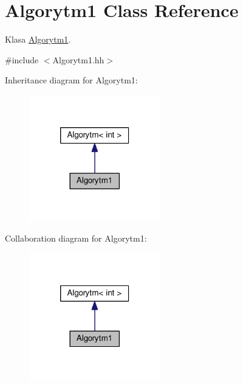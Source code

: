 \hypertarget{a00002}{}\section{Algorytm1 Class Reference}
\label{a00002}


Klasa \hyperlink{a00002}{Algorytm1}.  




{\ttfamily \#include $<$Algorytm1.\+hh$>$}



Inheritance diagram for Algorytm1\+:
\nopagebreak
\begin{figure}[H]
\begin{center}
\leavevmode
\includegraphics[width=162pt]{a00104}
\end{center}
\end{figure}


Collaboration diagram for Algorytm1\+:
\nopagebreak
\begin{figure}[H]
\begin{center}
\leavevmode
\includegraphics[width=162pt]{a00105}
\end{center}
\end{figure}
